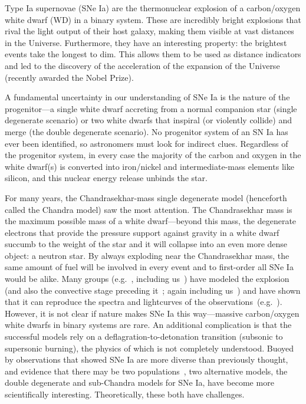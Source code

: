 Type Ia supernovae (SNe Ia) are the thermonuclear explosion of a
carbon/oxygen white dwarf (WD) in a binary system.  These are incredibly
bright explosions that rival the light output of their host galaxy,
making them visible at vast distances in the Universe.  Furthermore,
they have an interesting property: the brightest events take the
longest to dim.  This allows them to be used as distance indicators
and led to the discovery of the acceleration of the expansion of the
Universe~\cite{Per99,Rie98} (recently awarded the Nobel Prize).

A fundamental uncertainty in our understanding of SNe Ia is the nature
of the progenitor---a single white dwarf accreting from a normal
companion star (single degenerate scenario) or two white dwarfs that
inspiral (or violently collide) and merge (the double degenerate
scenario).  No progenitor system of an SN Ia has ever been
identified, so astronomers must look for indirect clues.  Regardless
of the progenitor system, in every case the majority of the carbon and
oxygen in the white dwarf(s) is converted into iron/nickel and
intermediate-mass elements like silicon, and this nuclear energy
release unbinds the star.

For many years, the Chandrasekhar-mass single degenerate model
(henceforth called the Chandra model) saw the most attention.  The
Chandrasekhar mass is the maximum possible mass of a white
dwarf---beyond this mass, the degenerate electrons that provide the
pressure support against gravity in a white dwarf succumb to the
weight of the star and it will collapse into an even more dense
object: a neutron star.  By always exploding near the Chandrasekhar
mass, the same amount of fuel will be involved in every event and to
first-order all SNe Ia would be alike.  Many groups
(e.g.~\cite{gamezo:2005,Roe07,Jor08}, including us~\cite{Kru12,Ma13})
have modeled the explosion (and also the convective stage
preceding it~\cite{hoflichstein:2002}; again including us~\cite{Non12}) and have shown that it can reproduce the
spectra and lightcurves of the observations~(e.g.~\cite{Blo11}).
However, it is not clear if nature makes SNe Ia this way---massive
carbon/oxygen white dwarfs in binary systems are rare.  An additional
complication is that the successful models rely on a
deflagration-to-detonation transition (subsonic to supersonic
burning), the physics of which is not completely understood.  Buoyed by
observations that showed SNe Ia are more diverse than previously
thought, and evidence that there may be two
populations~\cite{MannucciEtAl06,howelletal+09,How11}, two
alternative models, the double
degenerate and sub-Chandra models for SNe Ia, have become more
scientifically interesting.  Theoretically, these both have
challenges.


